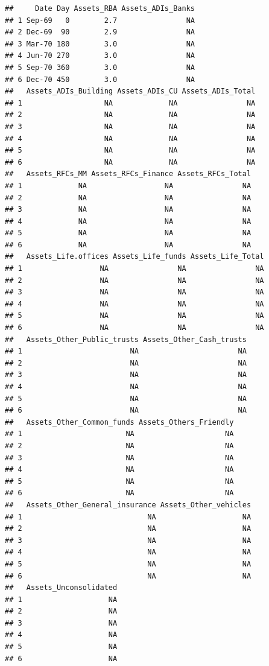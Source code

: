 \documentclass[
]{book}
\begin{document}
\begin{verbatim}
##     Date Day Assets_RBA Assets_ADIs_Banks
## 1 Sep-69   0        2.7                NA
## 2 Dec-69  90        2.9                NA
## 3 Mar-70 180        3.0                NA
## 4 Jun-70 270        3.0                NA
## 5 Sep-70 360        3.0                NA
## 6 Dec-70 450        3.0                NA
##   Assets_ADIs_Building Assets_ADIs_CU Assets_ADIs_Total
## 1                   NA             NA                NA
## 2                   NA             NA                NA
## 3                   NA             NA                NA
## 4                   NA             NA                NA
## 5                   NA             NA                NA
## 6                   NA             NA                NA
##   Assets_RFCs_MM Assets_RFCs_Finance Assets_RFCs_Total
## 1             NA                  NA                NA
## 2             NA                  NA                NA
## 3             NA                  NA                NA
## 4             NA                  NA                NA
## 5             NA                  NA                NA
## 6             NA                  NA                NA
##   Assets_Life.offices Assets_Life_funds Assets_Life_Total
## 1                  NA                NA                NA
## 2                  NA                NA                NA
## 3                  NA                NA                NA
## 4                  NA                NA                NA
## 5                  NA                NA                NA
## 6                  NA                NA                NA
##   Assets_Other_Public_trusts Assets_Other_Cash_trusts
## 1                         NA                       NA
## 2                         NA                       NA
## 3                         NA                       NA
## 4                         NA                       NA
## 5                         NA                       NA
## 6                         NA                       NA
##   Assets_Other_Common_funds Assets_Others_Friendly
## 1                        NA                     NA
## 2                        NA                     NA
## 3                        NA                     NA
## 4                        NA                     NA
## 5                        NA                     NA
## 6                        NA                     NA
##   Assets_Other_General_insurance Assets_Other_vehicles
## 1                             NA                    NA
## 2                             NA                    NA
## 3                             NA                    NA
## 4                             NA                    NA
## 5                             NA                    NA
## 6                             NA                    NA
##   Assets_Unconsolidated
## 1                    NA
## 2                    NA
## 3                    NA
## 4                    NA
## 5                    NA
## 6                    NA
\end{verbatim}
\end{document}
